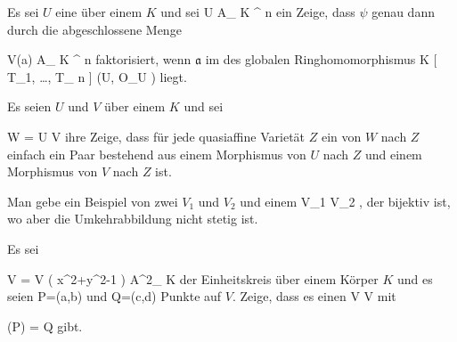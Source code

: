 {}
{





Es sei $U$ eine
über einem
$K$ und sei
\maabbdisp {{\psi}} { U } { { {\mathbb A}_{  K }^{  n   } }
} {}
ein
Zeige, dass ${\psi}$ genau dann durch die abgeschlossene Menge

\mavergleichskette
{\vergleichskette
{ V({\mathfrak a})
}
{ \subseteq }{ { {\mathbb A}_{  K }^{  n   } }
}
{  }{
}
{    }{
}
{   }{
}
}
{}{}{}
faktorisiert, wenn ${\mathfrak a}$ im
des globalen Ringhomomorphismus
\maabbdisp {\tilde{\psi}} { K [ T_1, \ldots ,  T_{ n }]  } { \Gamma (U, {\mathcal O}_U )
} {}
liegt.





}
{} {}

{}
{





Es seien $U$ und $V$
über einem
$K$ und sei

\mavergleichskette
{\vergleichskette
{W
}
{ = }{ U \uplus V
}
{  }{
}
{    }{
}
{   }{
}
}
{}{}{}
ihre
Zeige, dass für jede quasiaffine Varietät $Z$ ein
von $W$ nach $Z$ einfach ein Paar bestehend aus einem Morphismus von $U$ nach $Z$ und einem Morphismus von $V$ nach $Z$ ist.





}
{} {}

{}
{





Man gebe ein Beispiel von zwei
$V_1$ und $V_2$ und einem
\maabbdisp {{\psi}} {V_1 } { V_2
} {,}
der bijektiv ist, wo aber die Umkehrabbildung nicht stetig  ist.





}
{} {}

{}
{





Es sei

\mavergleichskette
{\vergleichskette
{ V
}
{ = }{ V \left(  x^2+y^2-1  \right)
}
{ \subseteq }{ {\mathbb A}^{2}_{ K }
}
{    }{
}
{   }{
}
}
{}{}{}
der Einheitskreis über einem Körper $K$ und es seien
\mathkor {} {P=(a,b)} {und} {Q=(c,d)} {}
Punkte auf $V$. Zeige, dass es einen
\maabb {\varphi} { V } { V
} {}
mit

\mavergleichskettedisp
{\vergleichskette
{ \varphi(P)
}
{ =} { Q
}
{ } {
}
{ } {
}
{ } {
}
}
{}{}{}
gibt.





}
{} {}

